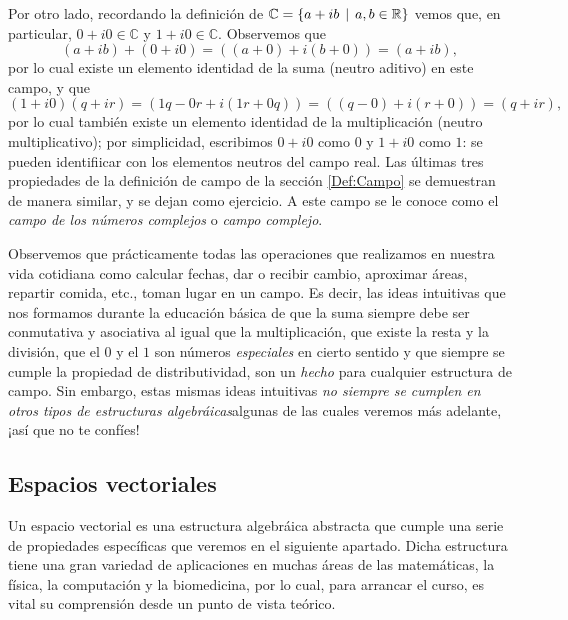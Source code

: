 \documentclass[apuntes]{subfiles}
\begin{document}
Por otro lado, recordando la definición de $\mathbb{C}=\{a+ib\hspace{1.5mm}|\hspace{1.5mm}a,b\in\mathbb{R}\}$ vemos que, en particular, $0+i0\in\mathbb{C}$ y $1+i0\in\mathbb{C}$. Observemos que $$(a+ib)+(0+i0)=((a+0)+i(b+0))=(a+ib),$$ por lo cual existe un elemento identidad de la suma (neutro aditivo) en este campo, y que $$(1+i0)(q+ir)=(1q-0r+i(1r+0q))=((q-0)+i(r+0))=(q+ir),$$ \noindent por lo cual también existe un elemento identidad de la multiplicación (neutro multiplicativo); por simplicidad, escribimos $0+i0$ como $0$ y $1+i0$ como $1$: se pueden identifiicar con los elementos neutros del campo real. Las últimas tres propiedades de la definición de campo de la sección \ref{Def:Campo} se demuestran de manera similar, y se dejan como ejercicio. A este campo se le conoce como el \emph{campo de los números complejos} o \emph{campo complejo}.

Observemos que prácticamente todas las operaciones que realizamos en nuestra vida cotidiana como calcular fechas, dar o recibir cambio, aproximar áreas, repartir comida, etc., toman lugar en un campo. Es decir, las ideas intuitivas que nos formamos durante la educación básica de que la suma siempre debe ser conmutativa y asociativa \textemdash al igual que la multiplicación\textemdash\hspace{0.5mm}, que existe la resta y la división, que el $0$ y el $1$ son números \emph{especiales} en cierto sentido y que siempre se cumple la propiedad de distributividad, son un \emph{hecho} para cualquier estructura de campo. Sin embargo, estas mismas ideas intuitivas \emph{no siempre se cumplen en otros tipos de estructuras algebráicas}\textemdash algunas de las cuales veremos más adelante\textemdash\hspace{0.5mm}, ¡así que no te confíes!

\newpage
\subsection{Espacios vectoriales} \label{Ssec: Espacios vectoriales}

Un espacio vectorial es una estructura algebráica abstracta que cumple una serie de propiedades específicas que veremos en el siguiente apartado. Dicha estructura tiene una gran variedad de aplicaciones en muchas áreas de las matemáticas, la física, la computación y la biomedicina, por lo cual, para arrancar el curso, es vital su comprensión desde un punto de vista teórico.
\end{document}
